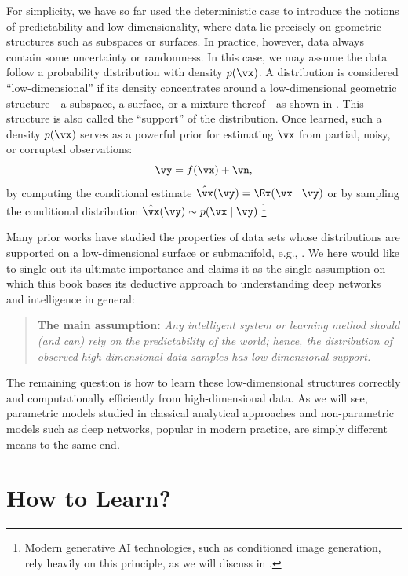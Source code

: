\documentclass[../../book-main.tex]{subfiles}
\begin{document}
For simplicity, we have so far used the deterministic case to
introduce the notions of predictability and low-dimensionality, where
data lie precisely on geometric structures such as subspaces or
surfaces. In practice, however, data always contain some uncertainty
or randomness. In this case, we may assume the data follow a
probability distribution with density \(p(\vx)\). A distribution is
considered ``low-dimensional'' if its density concentrates around a
low-dimensional geometric structure---a subspace, a surface, or a
mixture thereof---as shown in . This structure
is also called the ``support'' of the distribution. Once
learned, such a density \(p(\vx)\) serves as a powerful prior for
estimating \(\vx\) from partial, noisy, or corrupted observations:
\begin{equation}
    \vy = f(\vx) + \vn,
    \label{eqn:noisy-observation}
\end{equation}
by computing the conditional estimate \(\hat{\vx}(\vy) = \Ex(\vx \mid
\vy)\) or by sampling the conditional distribution \(\hat{\vx}(\vy)
\sim p(\vx\mid \vy)\).\footnote{Modern generative AI technologies,
    such as conditioned image generation, rely heavily on this principle,
as we will discuss in .}

Many prior works have studied the properties of data sets whose distributions 
are supported on a low-dimensional surface or submanifold, e.g., 
\cite{ALLARD2012435,LITTLE2017504}. We here would like to single out its
ultimate importance and claims it as the single assumption on which this book
bases its deductive approach to understanding deep networks and intelligence 
in general:
\begin{quote}
    \textbf{The main assumption:} \textit{Any intelligent system or
        learning method should (and can) rely on the predictability of
        the world; hence, the distribution of observed high-dimensional
    data samples has low-dimensional support.}
\end{quote}
The remaining question is how to learn these low-dimensional
structures correctly and computationally efficiently from
high-dimensional data. As we will see, parametric models studied in
classical analytical approaches and non-parametric models such as
deep networks, popular in modern practice, are simply different means
to the same end.

\section{How to Learn?}
\end{document}
